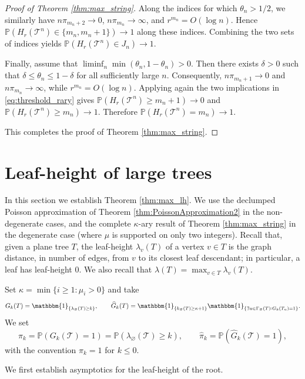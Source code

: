 \documentclass[a4paper,11pt]{article}
\DeclareRobustCommand{\P}{\mathbb{P}}
\DeclareRobustCommand{\1}{\mathbf{1}}
\begin{document}
\begin{proof}[Proof of Theorem \ref{thm:max_string}]
  Along the indices for which $\theta_n>1/2$, we similarly have
  $n\pi_{m_n+2}\to0$, $n\pi_{m_n}\to\infty$, and
  $r^{m_n}=O(\log n)$. Hence $
    \P(H_r(\mathcal T^n)\in\{m_n,m_n+1\})\to1$
  along these indices. Combining the two sets of indices yields
  $\P(H_r(\mathcal T^n)\in J_n)\to1$.

  Finally, assume that
  $\liminf_n\min(\theta_n,1-\theta_n)>0$. Then there exists
  $\delta>0$ such that $\delta\le\theta_n\le1-\delta$ for all sufficiently
  large $n$. Consequently, $n\pi_{m_n+1}\to0$ and
  $n\pi_{m_n}\to\infty$, while $r^{m_n}=O(\log n)$. Applying again the two
  implications in \eqref{eq:threshold_rary} gives
  $\P(H_r(\mathcal T^n)\ge m_n+1)\to0$ and
  $\P(H_r(\mathcal T^n)\ge m_n)\to1$. Therefore $
    \P(H_r(\mathcal T^n)=m_n)\to1$.

  This completes the proof of Theorem \ref{thm:max_string}.
\end{proof}


\section{Leaf-height of large trees}
\label{sec:leaf_height_counts}


In this section we establish Theorem \ref{thm:max_lh}. We use the declumped
Poisson approximation of Theorem \ref{thm:PoissonApproximation2} in the
non-degenerate cases, and the complete $\kappa$-ary result of Theorem
\ref{thm:max_string} in the degenerate case (where $\mu$ is supported on only two integers). Recall that, given a plane tree
$T$, the leaf-height $\lambda_v(T)$ of a vertex $v\in T$ is the graph distance, in number of edges, from $v$ to its closest leaf descendant; in particular, a leaf has leaf-height $0$. We also recall that $\lambda(T)=\max_{v\in T}\lambda_v(T)$.

Set $\kappa=\min\{i\ge1:\mu_i>0\}$ and take
$$
  G_k(T)=\mathbbm{1}_{\{\lambda_\varnothing(T)\ge k\}},
  \qquad
  \widehat{G}_k(T)
  =
  \mathbbm{1}_{\{k_\varnothing(T)\ge \kappa+1\}}
  \mathbbm{1}_{\{\exists u\in\Gamma_\varnothing(T):G_k(T_u)=1\}}.
$$
We set
$$
  \pi_k=\P(G_k(\mathcal T)=1)
  =
  \P(\lambda_\varnothing(\mathcal T)\ge k),
  \qquad
  \widehat{\pi}_k=\P(\widehat{G}_k(\mathcal T)=1),
$$
with the convention $\pi_k=1$ for $k\le0$.

We first establish asymptotics for the leaf-height of the root.
\end{document}
